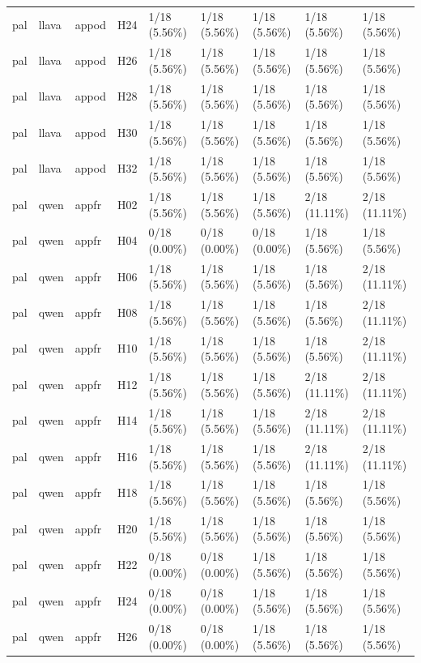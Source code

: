 \begin{longtable}{lllllllll}
pal & llava & appod & H24 & 1/18 (5.56\%) & 1/18 (5.56\%) & 1/18 (5.56\%) & 1/18 (5.56\%) & 1/18 (5.56\%) \\
pal & llava & appod & H26 & 1/18 (5.56\%) & 1/18 (5.56\%) & 1/18 (5.56\%) & 1/18 (5.56\%) & 1/18 (5.56\%) \\
pal & llava & appod & H28 & 1/18 (5.56\%) & 1/18 (5.56\%) & 1/18 (5.56\%) & 1/18 (5.56\%) & 1/18 (5.56\%) \\
pal & llava & appod & H30 & 1/18 (5.56\%) & 1/18 (5.56\%) & 1/18 (5.56\%) & 1/18 (5.56\%) & 1/18 (5.56\%) \\
pal & llava & appod & H32 & 1/18 (5.56\%) & 1/18 (5.56\%) & 1/18 (5.56\%) & 1/18 (5.56\%) & 1/18 (5.56\%) \\
pal & qwen & appfr & H02 & 1/18 (5.56\%) & 1/18 (5.56\%) & 1/18 (5.56\%) & 2/18 (11.11\%) & 2/18 (11.11\%) \\
pal & qwen & appfr & H04 & 0/18 (0.00\%) & 0/18 (0.00\%) & 0/18 (0.00\%) & 1/18 (5.56\%) & 1/18 (5.56\%) \\
pal & qwen & appfr & H06 & 1/18 (5.56\%) & 1/18 (5.56\%) & 1/18 (5.56\%) & 1/18 (5.56\%) & 2/18 (11.11\%) \\
pal & qwen & appfr & H08 & 1/18 (5.56\%) & 1/18 (5.56\%) & 1/18 (5.56\%) & 1/18 (5.56\%) & 2/18 (11.11\%) \\
pal & qwen & appfr & H10 & 1/18 (5.56\%) & 1/18 (5.56\%) & 1/18 (5.56\%) & 1/18 (5.56\%) & 2/18 (11.11\%) \\
pal & qwen & appfr & H12 & 1/18 (5.56\%) & 1/18 (5.56\%) & 1/18 (5.56\%) & 2/18 (11.11\%) & 2/18 (11.11\%) \\
pal & qwen & appfr & H14 & 1/18 (5.56\%) & 1/18 (5.56\%) & 1/18 (5.56\%) & 2/18 (11.11\%) & 2/18 (11.11\%) \\
pal & qwen & appfr & H16 & 1/18 (5.56\%) & 1/18 (5.56\%) & 1/18 (5.56\%) & 2/18 (11.11\%) & 2/18 (11.11\%) \\
pal & qwen & appfr & H18 & 1/18 (5.56\%) & 1/18 (5.56\%) & 1/18 (5.56\%) & 1/18 (5.56\%) & 1/18 (5.56\%) \\
pal & qwen & appfr & H20 & 1/18 (5.56\%) & 1/18 (5.56\%) & 1/18 (5.56\%) & 1/18 (5.56\%) & 1/18 (5.56\%) \\
pal & qwen & appfr & H22 & 0/18 (0.00\%) & 0/18 (0.00\%) & 1/18 (5.56\%) & 1/18 (5.56\%) & 1/18 (5.56\%) \\
pal & qwen & appfr & H24 & 0/18 (0.00\%) & 0/18 (0.00\%) & 1/18 (5.56\%) & 1/18 (5.56\%) & 1/18 (5.56\%) \\
pal & qwen & appfr & H26 & 0/18 (0.00\%) & 0/18 (0.00\%) & 1/18 (5.56\%) & 1/18 (5.56\%) & 1/18 (5.56\%) \\

\end{longtable}
